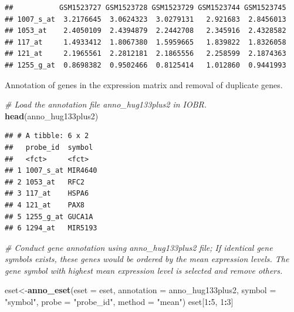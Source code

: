 \documentclass[
  12pt,
]{book}
\newenvironment{Shaded}{\begin{snugshade}}{\end{snugshade}}
\newcommand{\AttributeTok}[1]{\textcolor[rgb]{0.13,0.29,0.53}{#1}}
\newcommand{\CommentTok}[1]{\textcolor[rgb]{0.56,0.35,0.01}{\textit{#1}}}
\newcommand{\DecValTok}[1]{\textcolor[rgb]{0.00,0.00,0.81}{#1}}
\newcommand{\FunctionTok}[1]{\textcolor[rgb]{0.13,0.29,0.53}{\textbf{#1}}}
\newcommand{\NormalTok}[1]{#1}
\newcommand{\OtherTok}[1]{\textcolor[rgb]{0.56,0.35,0.01}{#1}}
\newcommand{\SpecialCharTok}[1]{\textcolor[rgb]{0.81,0.36,0.00}{\textbf{#1}}}
\newcommand{\StringTok}[1]{\textcolor[rgb]{0.31,0.60,0.02}{#1}}
\theoremstyle{definition}
\theoremstyle{definition}
\theoremstyle{definition}
\theoremstyle{definition}
\theoremstyle{remark}
\begin{document}
\begin{verbatim}
##           GSM1523727 GSM1523728 GSM1523729 GSM1523744 GSM1523745
## 1007_s_at  3.2176645  3.0624323  3.0279131   2.921683  2.8456013
## 1053_at    2.4050109  2.4394879  2.2442708   2.345916  2.4328582
## 117_at     1.4933412  1.8067380  1.5959665   1.839822  1.8326058
## 121_at     2.1965561  2.2812181  2.1865556   2.258599  2.1874363
## 1255_g_at  0.8698382  0.9502466  0.8125414   1.012860  0.9441993
\end{verbatim}

Annotation of genes in the expression matrix and removal of duplicate genes.

\begin{Shaded}
\begin{Highlighting}[]
\CommentTok{\# Load the annotation file \textasciigrave{}anno\_hug133plus2\textasciigrave{} in IOBR.}
\FunctionTok{head}\NormalTok{(anno\_hug133plus2)}
\end{Highlighting}
\end{Shaded}

\begin{verbatim}
## # A tibble: 6 x 2
##   probe_id  symbol 
##   <fct>     <fct>  
## 1 1007_s_at MIR4640
## 2 1053_at   RFC2   
## 3 117_at    HSPA6  
## 4 121_at    PAX8   
## 5 1255_g_at GUCA1A 
## 6 1294_at   MIR5193
\end{verbatim}

\begin{Shaded}
\begin{Highlighting}[]
\CommentTok{\# Conduct gene annotation using \textasciigrave{}anno\_hug133plus2\textasciigrave{} file; If identical gene symbols exists, these genes would be ordered by the mean expression levels. The gene symbol with highest mean expression level is selected and remove others. }

\NormalTok{eset}\OtherTok{\textless{}{-}}\FunctionTok{anno\_eset}\NormalTok{(}\AttributeTok{eset       =}\NormalTok{ eset,}
                \AttributeTok{annotation =}\NormalTok{ anno\_hug133plus2,}
                \AttributeTok{symbol     =} \StringTok{"symbol"}\NormalTok{,}
                \AttributeTok{probe      =} \StringTok{"probe\_id"}\NormalTok{,}
                \AttributeTok{method     =} \StringTok{"mean"}\NormalTok{)}
\NormalTok{eset[}\DecValTok{1}\SpecialCharTok{:}\DecValTok{5}\NormalTok{, }\DecValTok{1}\SpecialCharTok{:}\DecValTok{3}\NormalTok{]}
\end{Highlighting}
\end{Shaded}
\end{document}
